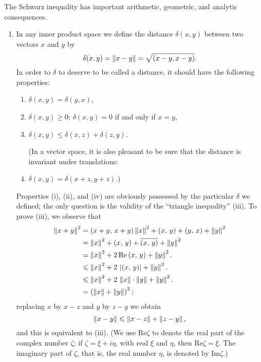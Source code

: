 The Schwarz inequality has important arithmetic, geometric, and analytic consequences.

\begin{enumerate}[wide, nosep, label=(\arabic*)]
    \item In any inner product space we define the distance \(\delta(x, y)\) between two vectors \(x\) and \(y\) by
    \begin{equation*}
        \delta(x, y) = \left\lVert x - y\right\rVert = \sqrt{(x - y, x - y)}.
    \end{equation*}
    In order to \(\delta\) to deserve to be called a distance, it should have the following properties:
    \begin{enumerate}[wide, nosep, label=(\roman*)]
        \item \(\delta(x, y) = \delta(y, x)\),
        \item \(\delta(x, y) \geq 0\); \(\delta(x, y) = 0\) if and only if \(x = y\),
        \item \(\delta(x, y) \leq \delta(x, z) + \delta(z, y)\).
        
        (In a vector space, it is also pleasant to be sure that the distance is invariant under translations:
        
        \item \(\delta(x, y) = \delta(x + z, y + z)\).)
    \end{enumerate}

    Properties (i), (ii), and (iv) are obviously possessed by the particular
    \(\delta\) we defined; the only question is the validity of the ``triangle
    inequality'' (iii). To prove (iii), we observe that
    \begin{align*}
        \left\lVert x + y\right\rVert^2 &= \left(x+y,\,x+y\right) \left\lVert x\right\rVert^2 + \left(x,\,y\right) + \left(y,\,x\right) + \left\lVert y\right\rVert^2\\
        &= \left\lVert x\right\rVert^2 + \left(x,\,y\right) + \overline{\left(x,\,y\right)} + \left\lVert y\right\rVert^2\\
        &= \left\lVert x\right\rVert^2 + 2\, \mathrm{Re}\left(x,\,y\right) + \left\lVert y\right\rVert^2.\\
        &\leqslant \left\lVert x\right\rVert^2 + 2\, \left\lvert\left(x,\,y\right)\right\rvert + \left\lVert y\right\rVert^2.\\
        &\leqslant \left\lVert x\right\rVert^2 + 2\, \left\lVert x\right\rVert\cdot\left\lVert y\right\rVert + \left\lVert y\right\rVert^2.\\
        &= \left(\left\lVert x\right\rVert + \left\lVert y\right\rVert\right)^2;
    \end{align*}
    replacing \(x\) by \(x - z\) and \(y\) by \(z - y\) we obtain
    \begin{equation*}
        \left\lVert x - y\right\rVert \leqslant \left\lVert x - z\right\rVert + \left\lVert z - y\right\rVert,
    \end{equation*}
    and this is equivalent to (iii). (We use \(\mathrm{Re}\zeta\) to denote the
    real part of the complex number \(\zeta\); if \(\zeta = \xi + i\eta\), with
    real \(\xi\) and \(\eta\), then \(\mathrm{Re} \zeta = \xi\). The imaginary
    part of \(\zeta\), that is, the real number \(\eta\), is denoted by
    \(\mathrm{Im} \zeta\).)


\end{enumerate}
